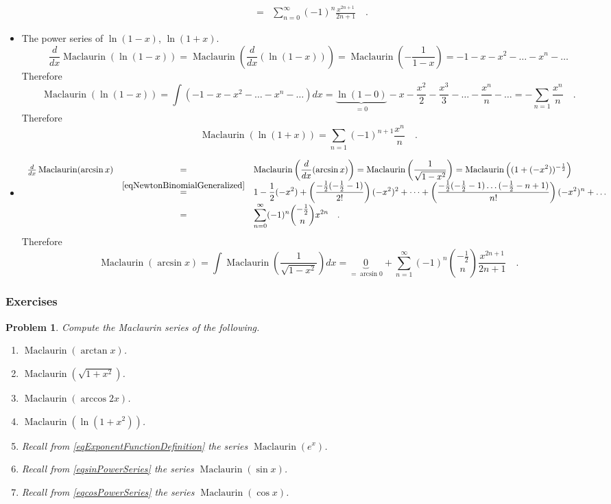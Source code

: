 \documentclass[12pt]{book}
\newtheorem{problem}{Problem}[section]
\DeclareMathOperator{\maclaurin}{Maclaurin}
\begin{document}
\begin{itemize}
\[\begin{array}{rcl}
&=&\displaystyle  \sum_{n=0}^{\infty} (-1)^n\frac{x^{2n+1}}{2n+1}\quad .
\end{array}
\]
\item The power series of $\ln (1-x)$, $\ln(1+x)$.
\[
\frac{d}{dx}\maclaurin(\ln (1-x))= \maclaurin \left(\frac{d}{dx}(\ln (1-x))\right) = \maclaurin \left(-\frac{1}{1-x}\right)= -1-x-x^2-\dots -x^n-\dots
\]
Therefore 
\[
\maclaurin(\ln (1-x) )=\int (-1-x-x^2-\dots -x^n-\dots)dx = \underbrace{\ln (1-0)}_{=0} - x- \frac{x^2}{2}- \frac{x^3}{3}-\dots - \frac{x^n}{n}-\dots= -\displaystyle\sum_{n=1}\frac{x^n}{n} \quad .
\]
Therefore 
\[
\maclaurin(\ln (1+x) )=\sum_{n=1}(-1)^{n+1}\frac{x^n}{n}\quad .
\]
\item 
\[
\begin{array}{rcl}
\frac{d}{dx}\maclaurin(\arcsin{x})&=&\displaystyle \maclaurin\left(\frac{d}{dx}(\arcsin{x})\right)= \maclaurin\left(\frac{1}{\sqrt{1-x^2}}\right)=
\maclaurin\left((1+(-x^2))^{-\frac{1}2}\right)\\
&\stackrel{\eqref{eqNewtonBinomialGeneralized}}{=}&\displaystyle 1-\frac{1}{2}(-x^{2})+ \left(\frac{-\frac{1}{2}(-\frac{1}2-1)}{2!}\right)(-x^2)^2+ \dots+ \left(\frac{-\frac{1}{2}(-\frac{1}2-1)\dots (-\frac{1}2-n+1)}{n!}\right)(-x^2)^n+\dots 
\\
&=& \displaystyle\sum\limits_{n=0}^{\infty} (-1)^n \binom{-\frac{1}{2}}{n} x^{2n}\quad .
\end{array}
\]
Therefore 
\[
\maclaurin(\arcsin x)=\int \maclaurin\left(\frac{1}{\sqrt{1-x^2}}\right) dx =\underbrace{0}_{=\arcsin 0} +\sum_{n=1}^{\infty} (-1)^n \binom{-\frac{1}{2}}{n} \frac{x^{2n+1}}{2n+1}\quad .
\]
\end{itemize}
\subsubsection{Exercises}
\begin{problem}
Compute the Maclaurin series of the following.
\begin{enumerate}
\item $\maclaurin (\arctan x) $.
\item $\maclaurin (\sqrt{1+x^2})$.
\item $\maclaurin (\arccos 2x)$.
\item $\maclaurin(\ln (1+x^2))$.
\item Recall from \eqref{eqExponentFunctionDefinition} the series $\maclaurin (e^x)$.
\item Recall from \eqref{eqsinPowerSeries} the series $\maclaurin (\sin x)$.
\item Recall from \eqref{eqcosPowerSeries} the series $\maclaurin (\cos x)$.
\end{enumerate}
\end{problem}
\end{document}
